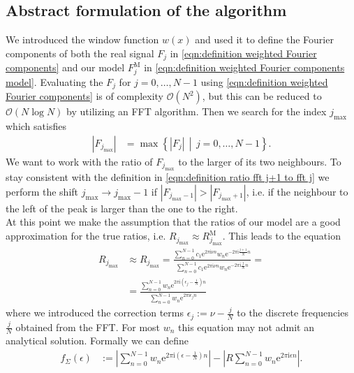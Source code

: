 \documentclass[english, parskip=full]{scrartcl}     %
\newcommand{\kla}{}
\newcommand{\klammer}{}
\newcommand{\tecxt}{}
\renewcommand{\i}{\text{i}}
\newcommand{\e}{\text{e}}
\begin{document}
\subsection{Abstract formulation of the algorithm}
We introduced the window function $w(x)$ and used it to define the Fourier components of both the real signal $F_j$ in \autoref{eqn:definition weighted Fourier components} and our model $F_j^\tecxt\text{M}$ in \autoref{eqn:definition weighted Fourier components model}.
Evaluating the $F_j$ for $j=0,\dots,N-1$ using \autoref{eqn:definition weighted Fourier components} is of complexity $\mathcal{O}(N^2)$, but this can be reduced to $\mathcal{O}(N\log N)$ by utilizing an FFT algorithm. 
Then we search for the index $j_\tecxt\text{max}$ which satisfies
\begin{align}
|F_{j_\tecxt\text{max}}| &= \max \klammer\left\{ |F_j|\,\middle\vert\, j=0,\dots,N-1 \right\}. \label{eqn:definition j max index}
\end{align}
We want to work with the ratio of $F_{j_\tecxt\text{max}}$ to the larger of its two neighbours.
To stay consistent with the definition in \autoref{eqn:definition ratio fft j+1 to fft j} we perform the shift $j_\tecxt\text{max} \rightarrow j_\tecxt\text{max} - 1$ if $|F_{j_\tecxt\text{max} - 1}| > |F_{j_\tecxt\text{max} + 1}|$, i.e. if the neighbour to the left of the peak is larger than the one to the right.\\
At this point we make the assumption that the ratios of our model are a good approximation for the true ratios, i.e. $R_{j_\tecxt\text{max}} \approx R_{j_\tecxt\text{max}}^\tecxt\text{M}$.
This leads to the equation
\begin{align}
R_{j_\tecxt\text{max}} &\approx R_{j_\tecxt\text{max}} = \frac{\sum_{n=0}^{N-1} c_1\e^{2\pi\i\nu n} w_n \e^{-2\pi\i \frac{j+1}{N}n} }{\sum_{n=0}^{N-1} c_1\e^{2\pi\i\nu n} w_n \e^{-2\pi\i \frac{j}{N}n}} = \\
&= \frac{\sum_{n=0}^{N-1} w_n \e^{2\pi\i \kla\left( \epsilon_j - \frac{1}{N} \right) n}}{\sum_{n=0}^{N-1} w_n \e^{2\pi\i \epsilon_j n}}
\end{align}
where we introduced the correction terms $\epsilon_j := \nu - \frac{j}{N}$ to the discrete frequencies $\frac{j}{N}$ obtained from the FFT.
For most $w_n$ this equation may not admit an analytical solution.
Formally we can define
\begin{align}
f_\Sigma(\epsilon) &:= \left\vert \sum_{n=0}^{N-1} w_n \e^{2\pi\i \kla\left( \epsilon - \frac{1}{N} \right) n} \right\vert - \left\vert R\sum_{n=0}^{N-1} w_n \e^{2\pi\i \epsilon n} \right\vert. \label{eqn:definition f eps sum repr}
\end{align}
\end{document}
